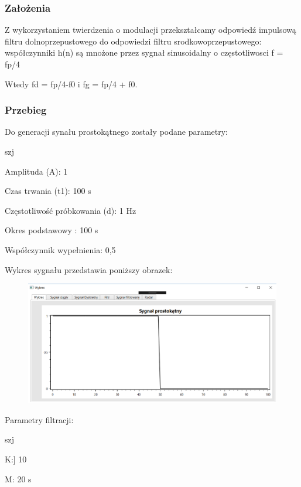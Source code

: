 \documentclass[12pt]{article}
\begin{document}
\subsubsection{Założenia}
Z wykorzystaniem twierdzenia o modulacji przekształcamy odpowiedź impulsową filtru dolnoprzepustowego do odpowiedzi filtru srodkowoprzepustowego:
współczynniki h(n) są mnożone przez sygnał sinusoidalny  o częstotliwosci f = fp/4

Wtedy fd = fp/4-f0 i fg = fp/4 + f0.

\subsubsection{Przebieg}
Do generacji synału prostokątnego zostały podane parametry:

\begin{labeling}{szj}
\item [Amplituda (A):] 1
\item [Czas trwania (t1):] 100 s
\item [Częstotliwość próbkowania (d): ] 1 Hz
\item [Okres podstawowy :] 100 s
\item [Współczynnik wypełnienia:] 0,5
\end{labeling}

Wykres sygnału przedstawia poniższy obrazek:
\begin{figure}[h!]
 \centering
 \includegraphics[width=12.3cm]{prost.PNG}
 \vspace{-0.3cm}
 \label{gw}
\end{figure}

Parametry filtracji:

\begin{labeling}{szj}
\item K:] 10
\item [M:] 20 s
\end{labeling}
\end{document}
